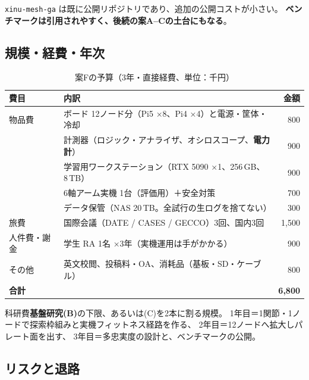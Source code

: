 \documentclass[11pt,a4paper]{article}
\newcommand{\code}[1]{\texttt{#1}}
\newcommand{\keyp}[1]{\textbf{\textcolor{blue!45!black}{#1}}}
\begin{document}
\noindent
\code{xinu-mesh-ga} は既に公開リポジトリであり、追加の公開コストが小さい。
\keyp{ベンチマークは引用されやすく、後続の案A--Cの土台にもなる}。

\subsection{規模・経費・年次}

\begin{table}[htbp]
\centering
\small
\caption{案Fの予算（3年・直接経費、単位：千円）}
\begin{tabularx}{\textwidth}{@{}l X r@{}}
\toprule
\textbf{費目} & \textbf{内訳} & \textbf{金額} \\
\midrule
物品費 & ボード 12ノード分（Pi5 ×8、Pi4 ×4）と電源・筐体・冷却 & 800 \\
       & 計測器（ロジック・アナライザ、オシロスコープ、\keyp{電力計}） & 900 \\
       & 学習用ワークステーション（RTX 5090 ×1、256\,GB、8\,TB） & 900 \\
       & 6軸アーム実機 1台（評価用）＋安全対策 & 700 \\
       & データ保管（NAS 20\,TB。全試行の生ログを捨てない） & 300 \\
\midrule
旅費 & 国際会議（DATE / CASES / GECCO）3回、国内3回 & 1,500 \\
\midrule
人件費・謝金 & 学生 RA 1名 ×3年（実機運用は手がかかる） & 900 \\
\midrule
その他 & 英文校閲、投稿料・OA、消耗品（基板・SD・ケーブル） & 800 \\
\midrule
\textbf{合計} & & \textbf{6,800} \\
\bottomrule
\end{tabularx}
\end{table}

\noindent
科研費\keyp{基盤研究(B)}の下限、あるいは(C)を2本に割る規模。
1年目＝1関節・1ノードで探索枠組みと実機フィットネス経路を作る、
2年目＝12ノードへ拡大しパレート面を出す、
3年目＝多忠実度の設計と、ベンチマークの公開。

\subsection{リスクと退路}
\end{document}
